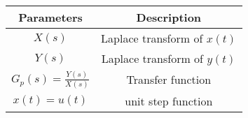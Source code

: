\begin{tabular}{|c|c|}
\hline
     \textbf{Parameters}&\textbf{Description}  \\
     \hline
     $X(s)$ & Laplace transform of $x(t)$ \\
     \hline
     $Y(s)$ & Laplace transform of $y(t)$ \\
     \hline
     $G_p(s) = \frac{Y(s)}{X(s)}$ & Transfer function\\
     \hline
     $x(t) = u(t)$ & unit step function\\
     \hline
\end{tabular}
